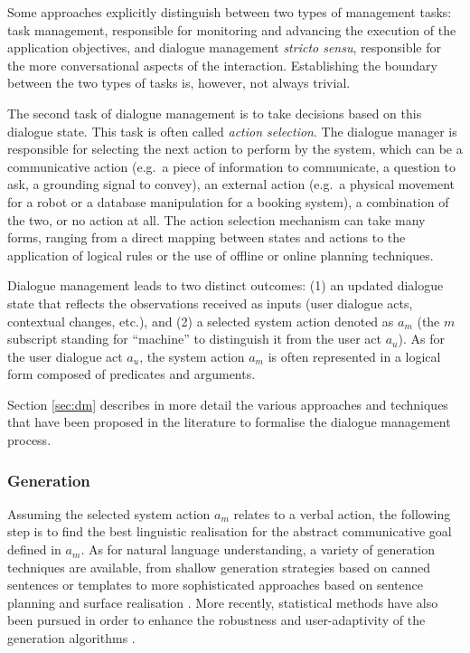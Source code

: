 Some approaches explicitly distinguish between two types of management tasks: task management, responsible for monitoring and advancing the execution of the application objectives, and dialogue management \textit{stricto sensu}, responsible for the more conversational aspects of the interaction. Establishing the boundary between the two types of tasks is, however, not always trivial.

The second task of dialogue management is to take decisions based on this dialogue state.  This task is often called \textit{action selection}.  The dialogue manager is responsible for selecting the next action to perform by the system, which can be a communicative action (e.g.\ a piece of information to communicate, a question to ask, a grounding signal to convey), an external action (e.g.\ a physical movement for a robot or a database manipulation for a booking system), a combination of the two, or no action at all.  The action selection mechanism can take many forms, ranging from a direct mapping between states and actions to the application of logical rules or the use of offline or online planning techniques. 

Dialogue management leads to two distinct outcomes: (1) an updated dialogue state that reflects the observations received as inputs (user dialogue acts, contextual changes, etc.), and (2) a selected system action denoted as $a_m$ (the $m$ subscript standing for ``machine'' to distinguish it from the user act $a_u$).  As for the user dialogue act $a_u$, the system action $a_m$ is often represented in a logical form composed of predicates and arguments. 

Section \ref{sec:dm} describes in more detail the various approaches and techniques that have been proposed in the literature to formalise the dialogue management process. 

\subsubsection*{Generation}
Assuming the selected system action $a_m$ relates to a verbal action, the following step is to find the best linguistic realisation for the abstract communicative goal defined in $a_m$.  As for natural language understanding, a variety of generation techniques are available, from shallow generation strategies based on canned sentences or templates to more sophisticated approaches based on sentence planning and surface realisation \citep{Stone2003,koller-stone:2007}.  More recently, statistical methods have also been pursued in order to enhance the robustness and user-adaptivity of the generation algorithms \citep{Rieser:2010,DethlefsC11}. 

